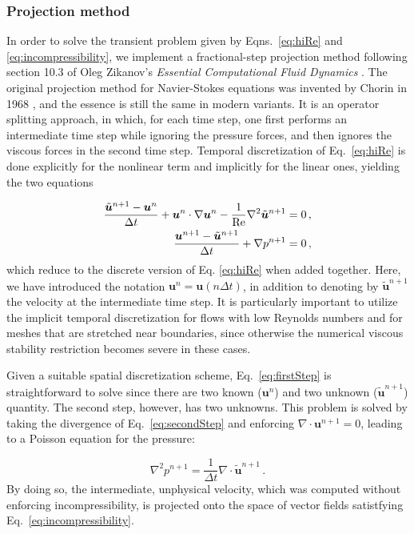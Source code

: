 \documentclass[final,3p,twocolumn]{elsarticle}
\begin{document}
\subsubsection{Projection method}

In order to solve the transient problem given by Eqns.\ \eqref{eq:hiRe} and
\eqref{eq:incompressibility}, we implement a fractional-step projection method
following section 10.3 of Oleg Zikanov's {\em Essential Computational Fluid
Dynamics} \cite{zikanov2010essential}. The original projection method for
Navier-Stokes equations was invented by Chorin in 1968
\cite{chorin1968numerical}, and the essence is still the same in modern
variants. It is an operator splitting approach, in which, for each time step,
one first performs an intermediate time step while ignoring the pressure
forces, and then ignores the viscous forces in the second time step.
Temporal discretization of Eq. \eqref{eq:hiRe} is done explicitly for the
nonlinear term and implicitly for the linear ones, yielding the two equations 

\begin{align}
    \label{eq:firstStep}
    \frac{\tilde{\bm{u}}^{n+1} - \bm{u}^n}{\Delta t} + \bm{u}^n \cdot \nabla
    \bm{u}^n - \frac{1}{\rm Re} \nabla^2 \tilde{\bm{u}}^{n+1} &= 0 \,, \\
    \label{eq:secondStep}
    \frac{\bm{u}^{n+1} - \tilde{\bm{u}}^{n+1}}{\Delta t} + \nabla p^{n+1} &= 0
    \,,
\end{align}
%
which reduce to the discrete version of Eq. \eqref{eq:hiRe} when added
together. Here, we have introduced the notation $\bm{u}^n = \bm{u}(n \Delta
t)$, in addition to denoting by $\tilde{\bm{u}}^{n+1}$ the velocity at the
intermediate time step.  It is particularly important to utilize the implicit
temporal discretization for flows with low Reynolds numbers and for meshes that
are stretched near boundaries, since otherwise the numerical viscous stability
restriction becomes severe in these cases. 

Given a suitable spatial discretization scheme, Eq.\ \eqref{eq:firstStep} is
straightforward to solve since there are two known ($\bm{u}^n$) and two unknown
($\tilde{\bm{u}}^{n+1}$) quantity. The second step, however, has two unknowns.
This problem is solved by taking the divergence of Eq. \eqref{eq:secondStep}
and enforcing $\nabla \cdot \bm{u}^{n+1} = 0$, leading to a Poisson equation
for the pressure:

\begin{equation} 
    \nabla^2 p^{n+1} = \frac{1}{\Delta t} \nabla \cdot \tilde{\bm{u}}^{n+1} \,.
    \label{eq:poissonPressure}
\end{equation}
%
By doing so, the intermediate, unphysical velocity, which was computed without
enforcing incompressibility, is projected onto the space of vector fields
satistfying Eq.\ \eqref{eq:incompressibility}. 
\end{document}
